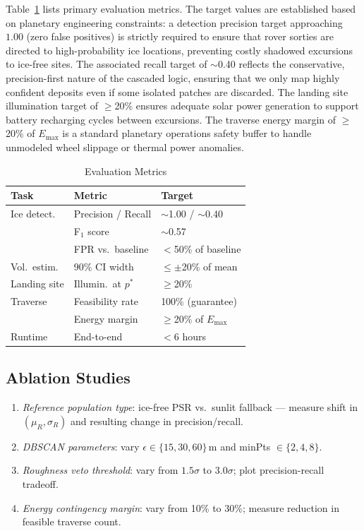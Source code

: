 \documentclass[10pt,conference]{IEEEtran}
\begin{document}
Table~\ref{tab:metrics} lists primary evaluation metrics. The target values are established based on planetary engineering constraints: a detection precision target approaching $1.00$ (zero false positives) is strictly required to ensure that rover sorties are directed to high-probability ice locations, preventing costly shadowed excursions to ice-free sites. The associated recall target of $\sim$0.40 reflects the conservative, precision-first nature of the cascaded logic, ensuring that we only map highly confident deposits even if some isolated patches are discarded. The landing site illumination target of $\ge$20\% ensures adequate solar power generation to support battery recharging cycles between excursions. The traverse energy margin of $\ge$20\% of $E_{\max}$ is a standard planetary operations safety buffer to handle unmodeled wheel slippage or thermal power anomalies.

\begin{table}[htbp]
\caption{Evaluation Metrics}
\label{tab:metrics}
\centering
\small
\setlength{\tabcolsep}{4pt}
\begin{tabular}{p{1.6cm}p{2.8cm}p{2.2cm}}
\toprule
Task & Metric & Target \\
\midrule
Ice detect. & Precision / Recall & $\sim$1.00 / $\sim$0.40 \\
 & F$_1$ score & $\sim$0.57 \\
 & FPR vs.\ baseline & $<$50\% of baseline \\
Vol.\ estim. & 90\% CI width & $\le\pm$20\% of mean \\
Landing site & Illumin.\ at $p^*$ & $\ge$20\% \\
Traverse & Feasibility rate & 100\% (guarantee) \\
 & Energy margin & $\ge$20\% of $E_{\max}$ \\
Runtime & End-to-end & $<$6 hours \\
\bottomrule
\end{tabular}
\end{table}


\subsection{Ablation Studies}

\begin{enumerate}
  \item \textit{Reference population type}: ice-free PSR vs.\ sunlit
    fallback --- measure shift in $(\mu_R, \sigma_R)$ and resulting
    change in precision/recall.
  \item \textit{DBSCAN parameters}: vary $\epsilon \in \{15, 30, 60\}$\,m
    and minPts $\in \{2, 4, 8\}$.
  \item \textit{Roughness veto threshold}: vary from $1.5\sigma$ to
    $3.0\sigma$; plot precision-recall tradeoff.
  \item \textit{Energy contingency margin}: vary from 10\% to 30\%;
    measure reduction in feasible traverse count.
\end{enumerate}
\end{document}
